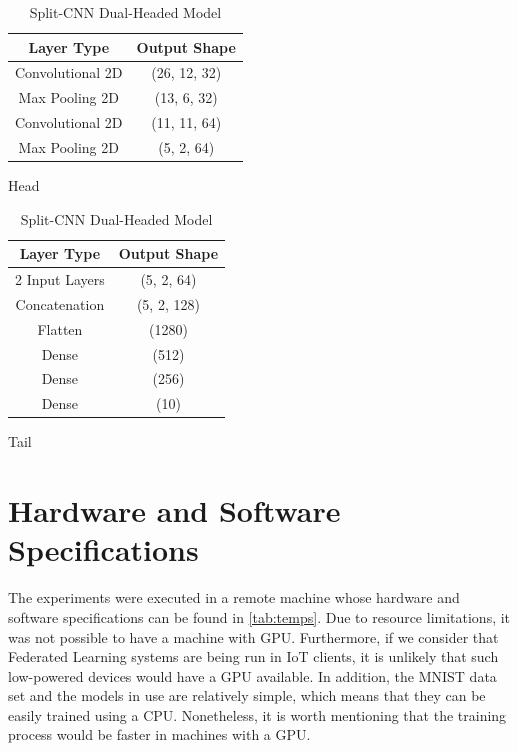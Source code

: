 \begin{table}[!h]
    \begin{subtable}[h]{0.49\textwidth}
        \centering
        \begin{tabular}{c|c}
            \hline \hline
            Layer Type       & Output Shape \\ \hline \hline
            Convolutional 2D & (26, 12, 32) \\ \hline
            Max Pooling 2D   & (13, 6, 32) \\ \hline
            Convolutional 2D & (11, 11, 64) \\ \hline
            Max Pooling 2D   & (5, 2, 64)   \\ \hline
        \end{tabular}
        \caption{Head}
    \end{subtable}
    \hfill
    \begin{subtable}[h]{0.49\textwidth}
        \centering
        \begin{tabular}{c|c}
            \hline\hline
            Layer Type     & Output Shape \\ \hline\hline
            2 Input Layers & (5, 2, 64)   \\ \hline
            Concatenation  & (5, 2, 128)  \\ \hline
            Flatten        & (1280)       \\ \hline
            Dense          & (512)        \\ \hline
            Dense          & (256)        \\ \hline
            Dense          & (10)         \\ \hline
        \end{tabular}
        \caption{Tail}
     \end{subtable}
     \caption{Split-CNN Dual-Headed Model}
     \label{tab:splitnn}
\end{table}

\section{Hardware and Software Specifications}

The experiments were executed in a remote machine whose hardware and software specifications can be found in \autoref{tab:temps}. Due to resource limitations, it was not possible to have a machine with GPU. Furthermore, if we consider that Federated Learning systems are being run in IoT clients, it is unlikely that such low-powered devices would have a GPU available. In addition, the MNIST data set and the models in use are relatively simple, which means that they can be easily trained using a CPU. Nonetheless, it is worth mentioning that the training process would be faster in machines with a GPU.

